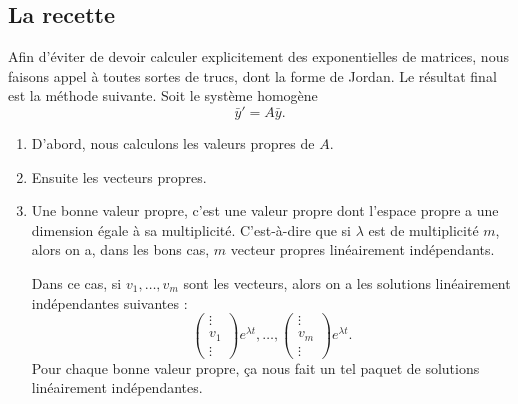 \subsection{La recette}

Afin d'éviter de devoir calculer explicitement des exponentielles de matrices, nous faisons appel à toutes sortes de trucs, dont la forme de Jordan. Le résultat final est la méthode suivante. Soit le système homogène
\begin{equation}
	\bar y'=A\bar y.
\end{equation}

\let\oldTheEnumi\theenumi
\renewcommand{\theenumi}{\arabic{enumi}.}
\begin{enumerate}

	\item
	      D'abord, nous calculons les valeurs propres de \( A\).

	\item
	      Ensuite les vecteurs propres.

	\item\label{ItemRapSystDc}
	      Une bonne valeur propre, c'est une valeur propre dont l'espace propre a une dimension égale à sa multiplicité. C'est-à-dire que si \( \lambda\) est de multiplicité \( m\), alors on a, dans les bons cas,  \( m\) vecteur propres linéairement indépendants.

	      Dans ce cas, si \( v_1,\ldots,v_m\) sont les vecteurs, alors on a les solutions linéairement indépendantes suivantes :
	      \begin{equation}
		      \begin{pmatrix}
			      \vdots \\
			      v_1    \\
			      \vdots
		      \end{pmatrix} e^{\lambda t},\ldots,
		      \begin{pmatrix}
			      \vdots \\
			      v_m    \\
			      \vdots
		      \end{pmatrix} e^{\lambda t}.
	      \end{equation}
	      Pour chaque bonne valeur propre, ça nous fait un tel paquet de solutions linéairement indépendantes.


\end{enumerate}
